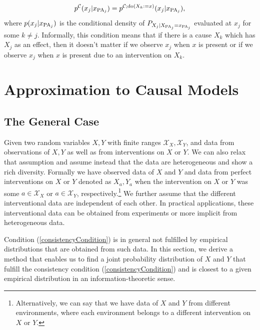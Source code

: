 \documentclass[letterpaper]{article}
\newcommand{\kC}{\mathcal{C}}   %
\newcommand{\kX}{\mathcal{X}}   %
\newcommand{\DO}{{\rm do}}
\begin{document}
\begin{equation} \label{consistencyCondition}
p^\kC(x_j | x_{{\rm PA}_j}) = p^{\kC; \DO(X_k:=x)}(x_j|x_{{\rm PA}_j}),
\end{equation}
where $p(x_j|x_{{\rm PA}_j})$ is the conditional density of $P_{X_j|X_{{\rm PA}_j}=x_{{\rm PA}_j}}$ evaluated at $x_j$ for some $k \neq j$. Informally, this condition means that if there is a cause $X_k$ which has $X_j$ as an effect, then it doesn't matter if we observe $x_j$ when $x$ is present or if we observe $x_j$ when $x$ is present due to an intervention on $X_k$. 

\section{Approximation to Causal Models} \label{sec.iacm}

\subsection{The General Case} \label{section.general_case}

Given two random variables $X, Y$ with finite ranges $\kX_X, \kX_Y$, and data from observations of $X, Y$ as well as from interventions on $X$ or $Y$. We can also relax that assumption and assume instead that the data are heterogeneous and show a rich diversity. Formally we have observed data of $X$ and $Y$ and data from perfect interventions on $X$ or $Y$ denoted as $X_a, Y_a$ when the intervention on $X$ or $Y$ was some $a \in \kX_X$ or $a \in \kX_Y$, respectively.\footnote{Alternatively, we can say that we have data of $X$ and $Y$ from different environments, where each environment belongs to a different intervention on $X$ or $Y$.} We further assume that the different interventional data are independent of each other. In practical applications, these interventional data can be obtained from experiments or more implicit from heterogeneous data.

Condition (\ref{consistencyCondition}) is in general not fulfilled by empirical distributions that are obtained from such data. In this section, we derive a method that enables us to find a joint probability distribution of $X$ and $Y$ that fulfill the consistency condition (\ref{consistencyCondition}) and is closest to a given empirical distribution in an information-theoretic sense.
\end{document}
